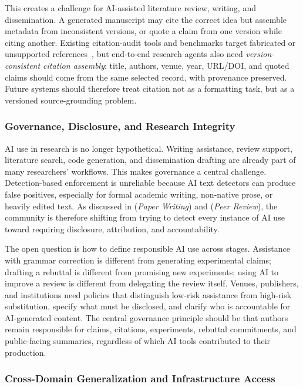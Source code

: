 This creates a challenge for AI-assisted literature review, writing, and dissemination. A generated manuscript may cite the correct idea but assemble metadata from inconsistent versions, or quote a claim from one version while citing another. Existing citation-audit tools and benchmarks target fabricated or unsupported references~\cite{citeme2024,scholarcop2025}, but end-to-end research agents also need \emph{version-consistent citation assembly}: title, authors, venue, year, URL/DOI, and quoted claims should come from the same selected record, with provenance preserved. Future systems should therefore treat citation not as a formatting task, but as a versioned source-grounding problem.


\subsubsection{Governance, Disclosure, and Research Integrity}

AI use in research is no longer hypothetical. Writing assistance, review support, literature search, code generation, and dissemination drafting are already part of many researchers' workflows. This makes governance a central challenge. Detection-based enforcement is unreliable because AI text detectors can produce false positives, especially for formal academic writing, non-native prose, or heavily edited text. As discussed in \Sfive (\emph{Paper Writing}) and \Ssix (\emph{Peer Review}), the community is therefore shifting from trying to detect every instance of AI use toward requiring disclosure, attribution, and accountability.

The open question is how to define responsible AI use across stages. Assistance with grammar correction is different from generating experimental claims; drafting a rebuttal is different from promising new experiments; using AI to improve a review is different from delegating the review itself. Venues, publishers, and institutions need policies that distinguish low-risk assistance from high-risk substitution, specify what must be disclosed, and clarify who is accountable for AI-generated content. The central governance principle should be that authors remain responsible for claims, citations, experiments, rebuttal commitments, and public-facing summaries, regardless of which AI tools contributed to their production.


\subsubsection{Cross-Domain Generalization and Infrastructure Access}

